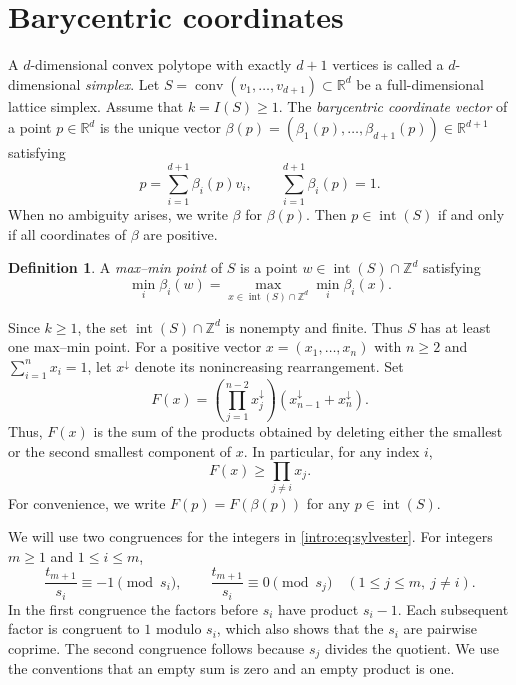 \documentclass[reqno, 11pt]{article}
\numberwithin{equation}{section}
\theoremstyle{definition}
\newtheorem{definition}[definition]{Definition}
\newcommand{\Z}{\mathbb Z}
\begin{document}
\section{Barycentric coordinates}\label{sec:preliminaries}

A $d$-dimensional convex polytope with exactly $d+1$ vertices is called a $d$-dimensional \emph{simplex}.
Let $S=\operatorname{conv}(v_1,\ldots,v_{d+1})\subset\mathbb{R}^d$ be a full-dimensional lattice simplex.
Assume that $k=I(S)\ge1$.
The \emph{barycentric coordinate vector} of a point $p\in\mathbb{R}^d$
is the unique vector
$\beta(p)=(\beta_1(p),\ldots,\beta_{d+1}(p))\in\mathbb{R}^{d+1}$
satisfying
\[
p=\sum_{i=1}^{d+1}\beta_i(p)v_i,
\qquad
\sum_{i=1}^{d+1}\beta_i(p)=1.
\]
When no ambiguity arises, we write $\beta$ for $\beta(p)$.
Then $p\in\operatorname{int}(S)$ if and only if all coordinates
of $\beta$ are positive. 




\begin{definition}\label{def:max-min}
A \emph{max--min point} of $S$ is a point
$w\in\operatorname{int}(S)\cap\Z^d$ satisfying
\[
\min_i\beta_i(w)
=
\max_{x\in\operatorname{int}(S)\cap\Z^d}\min_i\beta_i(x).
\]
\end{definition}

Since $k\ge1$, the set $\operatorname{int}(S)\cap\mathbb{Z}^d$
is nonempty and finite. Thus $S$ has at least one max--min point.
For a positive vector $x=(x_1,\ldots,x_n)$ with $n\ge2$ and
$\sum_{i=1}^{n}x_i=1$, let $x^\downarrow$ denote its
nonincreasing rearrangement. Set
\[
F(x)=
\left(\prod_{j=1}^{n-2}x_j^\downarrow\right)
\left(x_{n-1}^\downarrow+x_n^\downarrow\right).
\]
Thus, $F(x)$ is the sum of the products obtained by deleting
either the smallest or the second smallest component of $x$. In particular, for any index $i$,
\begin{equation}\label{geo:eq:delete-one}
 F(x)\ge\prod_{j\ne i}x_j.
\end{equation}
For convenience, we write \(F(p) = F(\beta(p))\) for any \(p \in \operatorname{int}(S)\).



We will use two congruences for the integers in \eqref{intro:eq:sylvester}.
For integers $m\ge1$ and $1\le i\le m$, 
\begin{equation}\label{prelim:eq:sylvester-congruences}
 \frac{t_{m+1}}{s_i}\equiv-1\pmod{s_i},\qquad
 \frac{t_{m+1}}{s_i}\equiv0\pmod{s_j}
 \quad(1\le j\le m,\ j\ne i).
\end{equation}
In the first congruence the factors before $s_i$ have product
$s_i-1$. Each subsequent factor is congruent to $1$ modulo $s_i$,
which also shows that the $s_i$ are pairwise coprime.
The second congruence follows because $s_j$ divides the quotient. We use the conventions
that an empty sum is zero and an empty product is one.
\end{document}
